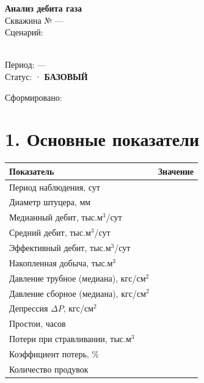 \documentclass[12pt]{article}
\begin{document}
\thispagestyle{empty}

\begin{center}
\vspace*{3cm}

{\LARGE\bfseries Анализ дебита газа}\\[0.5em]
{\large Скважина № — }\\[1em]

{\large Сценарий: }\\[0.3em]
{\normalsize {}}\\[0.3em]

\vspace{1em}
{\large Период:  — }\\[0.3em]
Статус: 
 · \textbf{БАЗОВЫЙ}

\vspace{3cm}
{\normalsize Сформировано: }

\end{center}

\newpage

\section*{1. Основные показатели}

\begin{tabularx}{\textwidth}{|P{8cm}|R{7cm}|}
\hline
\textbf{Показатель} & \textbf{Значение} \\
\hline
Период наблюдения, сут                   &  \\
\hline
Диаметр штуцера, мм                      &  \\
\hline
Медианный дебит, тыс.м$^3$/сут           &  \\
\hline
Средний дебит, тыс.м$^3$/сут             &  \\
\hline
Эффективный дебит, тыс.м$^3$/сут         &  \\
\hline
Накопленная добыча, тыс.м$^3$            &  \\
\hline
Давление трубное (медиана), кгс/см$^2$   &  \\
\hline
Давление сборное (медиана), кгс/см$^2$   &  \\
\hline
Депрессия $\Delta P$, кгс/см$^2$         &  \\
\hline
Простои, часов                            &  \\
\hline
Потери при стравливании, тыс.м$^3$        &  \\
\hline
Коэффициент потерь, \%                    &  \\
\hline
Количество продувок                       &  \\
\hline
\end{tabularx}
\end{document}
